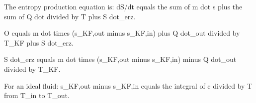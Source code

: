The entropy production equation is:  
dS/dt equals the sum of m dot s plus the sum of Q dot divided by T plus S dot_erz.  

O equals m dot times (s_KF,out minus s_KF,in) plus Q dot_out divided by T_KF plus S dot_erz.  

S dot_erz equals m dot times (s_KF,out minus s_KF,in) minus Q dot_out divided by T_KF.  

For an ideal fluid:  
s_KF,out minus s_KF,in equals the integral of c divided by T from T_in to T_out.
